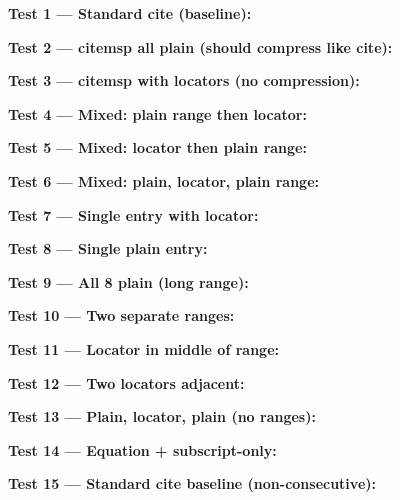 \documentclass{article}
\begin{document}
\textbf{Test 1 --- Standard cite (baseline):}
\cite{ref1,ref2,ref3,ref4,ref5}

\textbf{Test 2 --- citemsp all plain (should compress like cite):}

\textbf{Test 3 --- citemsp with locators (no compression):}

\textbf{Test 4 --- Mixed: plain range then locator:}

\textbf{Test 5 --- Mixed: locator then plain range:}

\textbf{Test 6 --- Mixed: plain, locator, plain range:}

\textbf{Test 7 --- Single entry with locator:}

\textbf{Test 8 --- Single plain entry:}

\textbf{Test 9 --- All 8 plain (long range):}

\textbf{Test 10 --- Two separate ranges:}

\textbf{Test 11 --- Locator in middle of range:}

\textbf{Test 12 --- Two locators adjacent:}

\textbf{Test 13 --- Plain, locator, plain (no ranges):}

\textbf{Test 14 --- Equation + subscript-only:}

\textbf{Test 15 --- Standard cite baseline (non-consecutive):}
\cite{ref1,ref2,ref3,ref5,ref6,ref7}

\printbibliography
\end{document}
